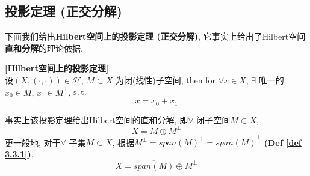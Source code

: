 \newpage

\subsection{投影定理 (正交分解)}
	下面我们给出\textbf{Hilbert空间上的投影定理 (正交分解)}, 它事实上给出了Hilbert空间\textbf{直和分解}的理论依据. 
	
	\vspace{1em}
	
	\begin{thm}\label{thm 3.3.2}
		\textbf{[Hilbert空间上的投影定理]}. \\
		设$(X , (\cdot , \cdot)) \in \mathcal{H}$, $M \subset X$ 为闭(线性)子空间, then for $\forall x \in X$, $\exists$ 唯一的$x_0 \in M$, $x_1 \in M^{\perp}$, $\operatorname{s.t.}$
		\[ x = x_0 + x_1 \]
		
		\vspace{2em}
		
		\begin{rmk}
			事实上该投影定理给出Hilbert空间的直和分解, 即$\forall$ 闭子空间$M \subset X$, 
			\[ X = M \oplus M^{\perp} \]
			更一般地, 对于$\forall$ 子集$M \subset X$, 根据$M^{\perp} = span(M)^{\perp} = \overline{span(M)}^{\perp}$ \textbf{(Def \ref{def 3.3.1})}, 
			\[ X = \overline{span(M)} \oplus M^{\perp} \]
		\end{rmk}
	
		\vspace{4em}
		

\end{thm}

